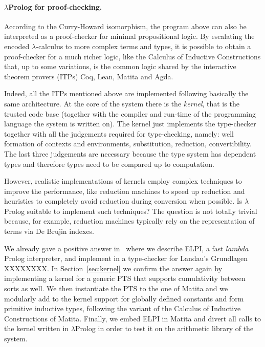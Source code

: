 \documentclass{easychair}
\begin{document}
\paragraph{$\lambda$Prolog for proof-checking.}

According to the Curry-Howard isomorphism, the program above can also
be interpreted as a proof-checker for minimal propositional logic. By
escalating the encoded $\lambda$-calculus to more complex terms and
types, it is possible to obtain a proof-checker for a much richer
logic, like the Calculus of Inductive Constructions that, up to some
variations, is the common logic shared by the interactive theorem
provers (ITPs) Coq, Lean, Matita and Agda.

Indeed, all the ITPs mentioned above are implemented following
basically the same architecture. At the core of the system there is
the \emph{kernel}, that is the trusted code base (together with the
compiler and run-time of the programming language the system is
written on). The kernel just implements the type-checker together with
all the judgements required for type-checking, namely: well formation
of contexts and environments, substitution, reduction, convertibility.
The last three judgements are necessary because the type system has
dependent types and therefore types need to be compared up to
computation.

However, realistic implementations of kernels employ complex techniques to improve the performance, like reduction machines to speed up reduction and heuristics to completely avoid reduction during conversion when possible. Is $\lambda$Prolog suitable to implement such techniques? The question is not totally trivial because, for example, reduction machines typically rely on the representation of terms via De Brujin indexes.

We already gave a positive answer in~\cite{elpiLPAR} where we describe
ELPI, a fast $lambda$Prolog interpreter, and implement in
a type-checker for Landau's Grundlagen XXXXXXXX.
In Section~\ref{sec:kernel} we confirm the answer again by implementing a
kernel for a generic PTS that supports cumulativity between sorts as well. We
then instantiate the PTS to the one of Matita and we modularly add to the
kernel support for globally defined constants and form primitive inductive
types, following the variant of the Calculus of Inductive Constructions of
Matita. Finally, we embed ELPI in Matita and divert all calls to the kernel
written in $\lambda$Prolog in order to test it on the arithmetic library of
the system.
\end{document}
